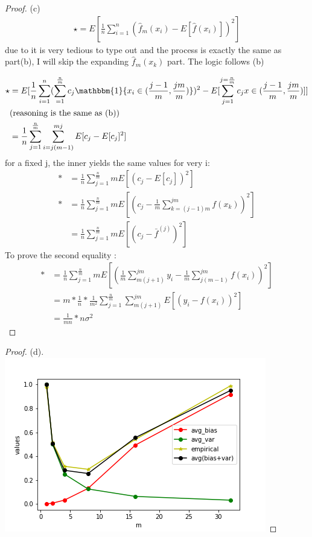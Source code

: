 \documentclass[12pt]{article}
\begin{document}
\begin{proof}
        (c)\\
        \[
\begin{aligned}
        \star = E[\frac{1}{n} \sum_{i=1}^{n} (\widehat{f}_m(x_i) - E[\widehat{f}(x_i)])^2 ] 
\end{aligned}
        \]
        due to it is very tedious to type out and the process is exactly the same as part(b), I will skip the expanding $\widehat{f}_m(x_k) $ part. The logic follows (b)
        
        \[
\begin{aligned}
        \star &=E[\frac{1}{n} \sum_{i=1}^{n} (\sum_{=1}^{\frac{n}{m}}c_j \mathbbm{1}\{x_i \in (\frac{j-1}{m}, \frac{jm}{m})\})^2 - E[\sum_{j=1}^{j=\frac{n}{m}} c_j x \in (\frac{j-1}{m}, \frac{jm}{m})]]\\
              &(\text{reasoning is the same as (b)})\\
         &= \frac{1}{n} \sum_{j=1}^{\frac{n}{m}}\sum_{i=j(m-1)}^{mj} E[c_j- E[c_j]^2]
\end{aligned}
        \]
        for a fixed j, the inner yields the same values for very i: \\
        \[
\begin{aligned}
        * &= \frac{1}{n} \sum_{j=1}^{\frac{n}{m}} m E[(c_j- E[c_j])^2] \\ 
        * & =  \frac{1}{n} \sum_{j=1}^{\frac{n}{m}} m E[(c_j- \frac{1}{m} \sum_{k=(j-1)m}^{jm} f(x_k)) ^2]\\
          &= \frac{1}{n} \sum_{j= 1}^{\frac{n}{m}} m E[(c_j-\bar{f}^{(j)})^2]
\end{aligned}
        \]
To prove the second equality : \\ 
\[
\begin{aligned}
        *&= \frac{1}{n} \sum_{j= 1}^{\frac{n}{m}} m E[(\frac{1}{m}\sum_{m(j+1)}^{jm} y_i -\frac{1}{m}\sum_{j(m-1)}^{jm} f(x_i))^2]\\
         &=m *\frac{1}{n} *\frac{1}{m^2}  \sum_{j= 1}^{\frac{n}{m}} \sum_{m(j+1)}^{jm}  E[(y_i - f(x_i))^2]\\
          & = \frac{1}{mn} * n\sigma^2
\end{aligned}
\]
\end{proof}

\begin{proof}
        (d).\\
        \includegraphics{../code/B1.png}
\end{proof}
\end{document}
